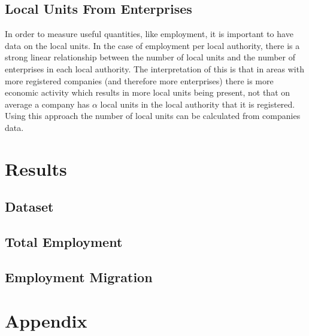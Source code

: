 \documentclass[a4paper,10pt]{article}
\begin{document}
\subsection{Local Units From Enterprises}
In order to measure useful quantities, like employment, it is important to have data on the local units. In the case of employment per local authority, there is a strong linear relationship between the number of local units and the number of enterprises in each local authority. The interpretation of this is that in areas with more registered companies (and therefore more enterprises) there is more economic activity which results in more local units being present, not that on average a company has $\alpha$ local units in the local authority that it is registered. %
Using this approach the number of local units can be calculated from companies data.
\section{Results}
\subsection{Dataset}
\subsection{Total Employment}
\subsection{Employment Migration}

\section{Appendix}
\end{document}

